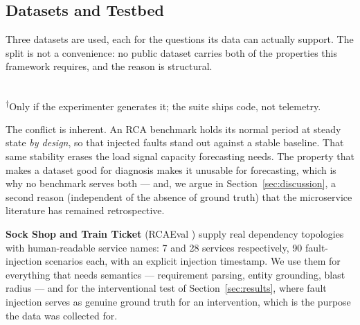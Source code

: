 \documentclass[journal, 10pt]{IEEEtran}
\begin{document}
\subsection{Datasets and Testbed}
Three datasets are used, each for the questions its data can actually
support. The split is not a convenience: no public dataset carries both of the
properties this framework requires, and the reason is structural.

\begin{table}[!t]
\centering
\caption{No single dataset carries both properties this framework requires, so
each question is answered on the data that supports it. \emph{Names} = service
names semantic enough to ground a requirement; \emph{Load} = load variation wide
enough to identify a workload-to-resource relationship.}
\label{tab:dataset-gap}
\\[2pt]
\footnotesize\textsuperscript{$\dagger$}Only if the experimenter generates it; the
suite ships code, not telemetry.
\end{table}

The conflict is inherent. An RCA benchmark holds its normal period at steady
state \emph{by design}, so that injected faults stand out against a stable
baseline. That same stability erases the load signal capacity forecasting needs.
The property that makes a dataset good for diagnosis makes it unusable for
forecasting, which is why no benchmark serves both --- and, we argue in
Section~\ref{sec:discussion}, a second reason (independent of the absence of
ground truth) that the microservice literature has remained retrospective.

\textbf{Sock Shop and Train Ticket} (RCAEval \cite{pham2024rcaeval}) supply real
dependency topologies with human-readable service names: 7 and 28 services
respectively, 90 fault-injection scenarios each, with an explicit injection
timestamp. We use them for everything that needs semantics --- requirement
parsing, entity grounding, blast radius --- and for the interventional test of
Section~\ref{sec:results}, where fault injection serves as genuine ground truth
for an intervention, which is the purpose the data was collected for.
\end{document}
